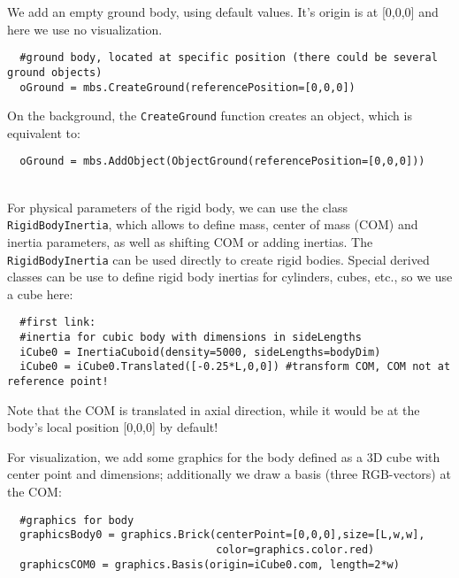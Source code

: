 \noindent We add an empty ground body, using default values. It's origin is at [0,0,0] and here we use no visualization.
\pythonstyle\begin{lstlisting}
  #ground body, located at specific position (there could be several ground objects)
  oGround = mbs.CreateGround(referencePosition=[0,0,0])
\end{lstlisting}
On the background, the \texttt{CreateGround} function creates an object, which is equivalent to:
\pythonstyle\begin{lstlisting}
  oGround = mbs.AddObject(ObjectGround(referencePosition=[0,0,0]))
\end{lstlisting}

\horizontalRuler\\
\noindent For physical parameters of the rigid body, we can use the class \texttt{RigidBodyInertia}, which allows to define mass, center of mass (COM) and inertia parameters, as well as shifting COM or adding inertias.
The \texttt{RigidBodyInertia} can be used directly to create rigid bodies. Special derived classes can be use to define rigid body inertias for cylinders, cubes, etc., so we use a cube here:
\pythonstyle\begin{lstlisting}
  #first link:
  #inertia for cubic body with dimensions in sideLengths
  iCube0 = InertiaCuboid(density=5000, sideLengths=bodyDim)
  iCube0 = iCube0.Translated([-0.25*L,0,0]) #transform COM, COM not at reference point!
\end{lstlisting}
Note that the COM is translated in axial direction, while it would be at the body's local position [0,0,0] by default!

\noindent For visualization, we add some graphics for the body defined as a 3D cube with center point and dimensions; additionally we draw a basis (three RGB-vectors) at the COM:
\pythonstyle\begin{lstlisting}
  #graphics for body
  graphicsBody0 = graphics.Brick(centerPoint=[0,0,0],size=[L,w,w],
                                 color=graphics.color.red)
  graphicsCOM0 = graphics.Basis(origin=iCube0.com, length=2*w)
\end{lstlisting}

